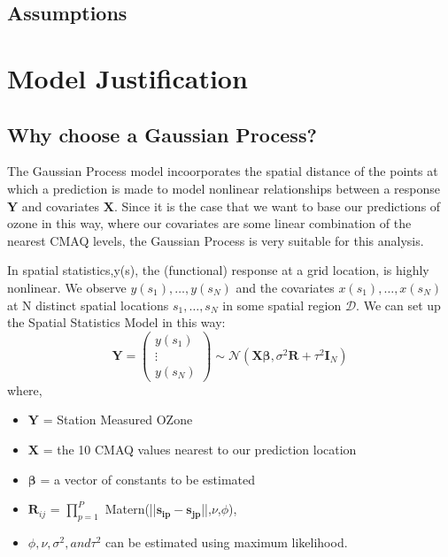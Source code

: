 \documentclass{article}                                                   %
\def\wl{\par \vspace{\baselineskip}}                                      %
\begin{document}
  \subsection{Assumptions}
\section{Model Justification}
  \subsection{Why choose a Gaussian Process?}
  The Gaussian Process model incoorporates the spatial distance of the points 
  at which a prediction is made to model nonlinear relationships between a
  response $\bm Y$ and covariates $\bm X$. Since it is the case that we want
  to base our predictions of ozone in this way, where our covariates are some
  linear combination of the nearest CMAQ levels, the Gaussian Process is very
  suitable for this analysis.
  \wl\noindent
  In spatial statistics,y(s), the (functional) response at a grid location,
  is highly nonlinear. We observe $y(s_1),\ldots,y(s_N)$ and the covariates
  $x(s_1),\ldots,x(s_N)$ at N distinct spatial locations $s_1,\ldots,s_N$
  in some spatial region $\mathcal{D}$.
  We can set up the Spatial Statistics Model in this way:
  \[ \bm Y = \begin{pmatrix} y(s_1) \\ \vdots \\ y(s_N) \end{pmatrix} 
             \sim \mathcal{N}(\bm{X\beta},\sigma^2\bm R + \tau^2\bm I_N) \] 
  where,  \begin{itemize}
            \item $\bm Y$ = Station Measured OZone
            \item $\bm X$ = the 10 CMAQ values nearest to our prediction location
            \item $\bm\beta$ = a vector of constants to be estimated
            \item $\bm R_{ij}$ = $\prod_{p=1}^P$ 
                                 Matern(||$\bm{s_{ip}-s_{jp}}$||,$\nu$,$\phi$), 
            \item $\phi,\nu,\sigma^2, and \tau^2$ can be estimated using 
                                                  maximum likelihood.
          \end{itemize}
         
\end{document}
